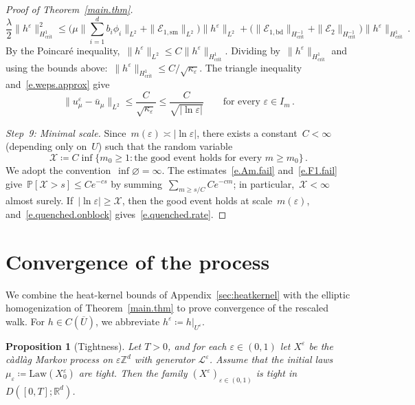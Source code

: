 \documentclass[11pt]{amsart}
\theoremstyle{plain}
\newtheorem{proposition}[theorem]{Proposition}
\theoremstyle{definition}
\theoremstyle{remark}
\newcommand{\Zd}{\mathbb{Z}^d}
\newcommand{\Rd}{\mathbb{R}^d}
\newcommand{\eps}{\varepsilon}
\renewcommand{\P}{\mathbb{P}}
\begin{document}
\begin{proof}[Proof of Theorem~\ref{main.thm}]
		\[
		\frac{\lambda}{2}\|h^\eps\|_{H^1_{\mathrm{crit}}}^2
		\le \bigl(\mu\|\textstyle\sum_{i=1}^{d} b_i\phi_i\|_{L^2} + \|\mathcal{E}_{1,\mathrm{sm}}\|_{L^2}\bigr)\|h^\eps\|_{L^2}
		+ \bigl(\|\mathcal{E}_{1,\mathrm{bd}}\|_{H^{-1}_{\mathrm{crit}}} + \|\mathcal{E}_2\|_{H^{-1}_{\mathrm{crit}}}\bigr)\|h^\eps\|_{H^1_{\mathrm{crit}}}\,.
		\]
		By the Poincar\'e inequality,~$\|h^\eps\|_{L^2} \le C\|h^\eps\|_{H^1_{\mathrm{crit}}}$.
		Dividing by~$\|h^\eps\|_{H^1_{\mathrm{crit}}}$ and using the bounds above:~$\|h^\eps\|_{H^1_{\mathrm{crit}}} \le C/\sqrt{\kappa_\eps}$.
		The triangle inequality and~\eqref{e.weps.approx} give
		\begin{equation}
			\label{e.quenched.onblock}
			\|u^\eps_\mu - \bar u_\mu\|_{L^2} \le \frac{C}{\sqrt{\kappa_\eps}} \le \frac{C}{\sqrt{|\ln\eps|}}
			\qquad \text{for every } \eps \in I_m\,.
		\end{equation}
		
		\smallskip
		
		\emph{Step~9: Minimal scale.}
		Since~$m(\eps) \asymp |\ln\eps|$, there exists a constant~$C < \infty$ (depending only on~$U$) such that the random variable
		\[
		\mathcal{X} \coloneqq C \inf\bigl\{m_0 \ge 1 : \text{the good event holds for every } m \ge m_0\bigr\}\,.
		\]
		We adopt the convention~$\inf\varnothing = \infty$.
		The estimates~\eqref{e.Am.fail} and~\eqref{e.F1.fail} give~$\P[\mathcal{X} > s] \le Ce^{-cs}$ by summing~$\sum_{m \ge s/C} Ce^{-cm}$; in particular,~$\mathcal{X} < \infty$ almost surely.
		If~$|\ln\eps| \ge \mathcal{X}$, then the good event holds at scale~$m(\eps)$, and~\eqref{e.quenched.onblock} gives~\eqref{e.quenched.rate}.
		
	\end{proof}
	
	\section{Convergence of the process}
	\label{sec:convergence}
	
	We combine the heat-kernel bounds of Appendix~\ref{sec:heatkernel} with the elliptic homogenization of Theorem~\ref{main.thm} to prove convergence of the rescaled walk.
	For $h \in C(\overline{U})$, we abbreviate $h^\eps \coloneqq h|_{U^\eps}$.
	
	\begin{proposition}[Tightness]
		\label{p.tightness}
		Let $T > 0$, and for each $\eps \in (0,1)$ let $X^\eps$ be the c\`adl\`ag Markov process on $\eps\Zd$ with generator $\mathcal{L}^\eps$.
		Assume that the initial laws $\mu_\eps \coloneqq \mathrm{Law}(X_0^\eps)$ are tight.
		Then the family $(X^\eps)_{\eps \in (0,1)}$ is tight in $D([0,T]; \Rd)$.
	\end{proposition}
	
\end{document}
